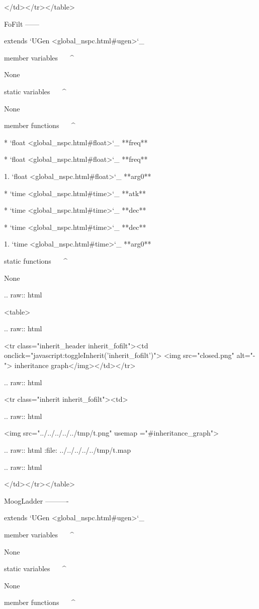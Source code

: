    </td></tr></table>

FoFilt
------

extends `UGen <global_nspc.html#ugen>`_ 

member variables
^^^^^^^^^^^^^^^^

	None

static variables
^^^^^^^^^^^^^^^^

	None

member functions
^^^^^^^^^^^^^^^^

	* `float <global_nspc.html#float>`_ **freq**

	* `float <global_nspc.html#float>`_ **freq**

		1. `float <global_nspc.html#float>`_ **arg0**

	* `time <global_nspc.html#time>`_ **atk**

	* `time <global_nspc.html#time>`_ **dec**

	* `time <global_nspc.html#time>`_ **dec**

		1. `time <global_nspc.html#time>`_ **arg0**

static functions
^^^^^^^^^^^^^^^^


	None


  .. raw:: html

   <table>


  .. raw:: html

   <tr class="inherit_header inherit_fofilt"><td onclick="javascript:toggleInherit('inherit_fofilt')"> <img src="closed.png" alt="-"> inheritance graph</img></td></tr>


  .. raw:: html

   <tr class="inherit inherit_fofilt"><td>


  .. raw:: html

   <img src="../../../../../tmp/t.png" usemap ="#inheritance_graph">


  .. raw:: html
   :file:   ../../../../../tmp/t.map


  .. raw:: html

   </td></tr></table>

MoogLadder
----------

extends `UGen <global_nspc.html#ugen>`_ 

member variables
^^^^^^^^^^^^^^^^

	None

static variables
^^^^^^^^^^^^^^^^

	None

member functions
^^^^^^^^^^^^^^^^

